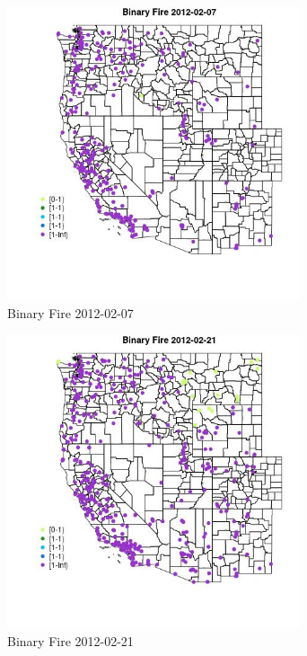 \begin{figure} 
\centering  
\includegraphics[width=0.77\textwidth]{Code_Outputs/Report_ML_input_PM25_Step4_part_f_de_duplicated_aves_prioritize_24hr_obswNAs_MapObsBinary_Fire2012-02-07.jpg} 
\caption{\label{fig:Report_ML_input_PM25_Step4_part_f_de_duplicated_aves_prioritize_24hr_obswNAsMapObsBinary_Fire2012-02-07}Binary Fire 2012-02-07} 
\end{figure} 
 

\clearpage 

\begin{figure} 
\centering  
\includegraphics[width=0.77\textwidth]{Code_Outputs/Report_ML_input_PM25_Step4_part_f_de_duplicated_aves_prioritize_24hr_obswNAs_MapObsBinary_Fire2012-02-21.jpg} 
\caption{\label{fig:Report_ML_input_PM25_Step4_part_f_de_duplicated_aves_prioritize_24hr_obswNAsMapObsBinary_Fire2012-02-21}Binary Fire 2012-02-21} 
\end{figure} 
 

